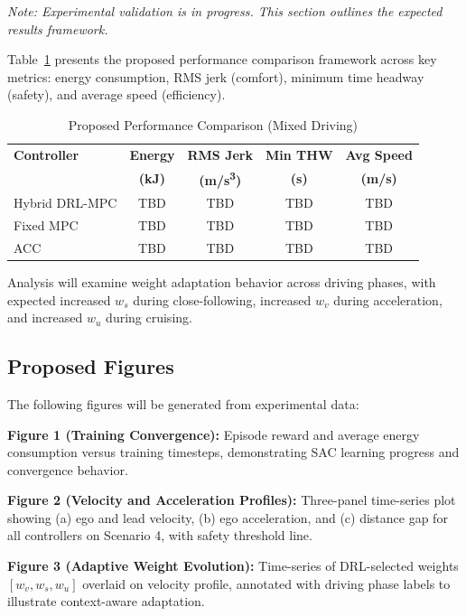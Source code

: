 \documentclass[conference,onecolumn,draftclsnofoot]{IEEEtran}
\begin{document}
\textit{Note: Experimental validation is in progress. This section outlines the expected results framework.}

Table~\ref{tab:metrics} presents the proposed performance comparison framework across key metrics: energy consumption, RMS jerk (comfort), minimum time headway (safety), and average speed (efficiency).

\begin{table}[htbp]
\caption{Proposed Performance Comparison (Mixed Driving)}
\begin{center}
\begin{tabular}{|l|c|c|c|c|}
\hline
\textbf{Controller} & \textbf{Energy} & \textbf{RMS Jerk} & \textbf{Min THW} & \textbf{Avg Speed} \\
\textbf{} & \textbf{(kJ)} & \textbf{(m/s\textsuperscript{3})} & \textbf{(s)} & \textbf{(m/s)} \\
\hline
Hybrid DRL-MPC & TBD & TBD & TBD & TBD \\
Fixed MPC & TBD & TBD & TBD & TBD \\
ACC & TBD & TBD & TBD & TBD \\
\hline
\end{tabular}
\label{tab:metrics}
\end{center}
\end{table}

Analysis will examine weight adaptation behavior across driving phases, with expected increased $w_s$ during close-following, increased $w_v$ during acceleration, and increased $w_u$ during cruising.

\subsection{Proposed Figures}

The following figures will be generated from experimental data:

\textbf{Figure 1 (Training Convergence):} Episode reward and average energy consumption versus training timesteps, demonstrating SAC learning progress and convergence behavior.

\textbf{Figure 2 (Velocity and Acceleration Profiles):} Three-panel time-series plot showing (a) ego and lead velocity, (b) ego acceleration, and (c) distance gap for all controllers on Scenario 4, with safety threshold line.

\textbf{Figure 3 (Adaptive Weight Evolution):} Time-series of DRL-selected weights $[w_v, w_s, w_u]$ overlaid on velocity profile, annotated with driving phase labels to illustrate context-aware adaptation.
\end{document}
